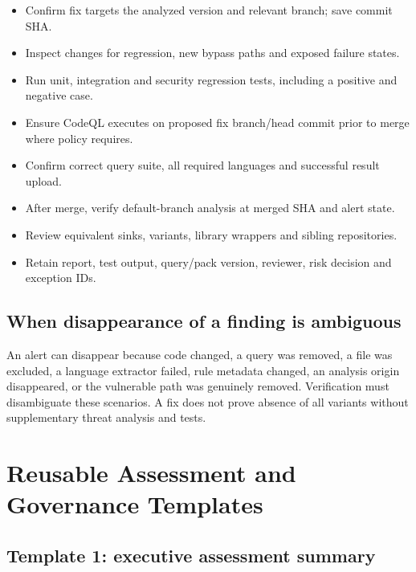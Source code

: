 \documentclass[11pt,letterpaper,oneside]{book}
\begin{document}
\begin{itemize}
\item Confirm fix targets the analyzed version and relevant branch; save commit SHA.
\item Inspect changes for regression, new bypass paths and exposed failure states.
\item Run unit, integration and security regression tests, including a positive and negative case.
\item Ensure CodeQL executes on proposed fix branch/head commit prior to merge where policy requires.
\item Confirm correct query suite, all required languages and successful result upload.
\item After merge, verify default-branch analysis at merged SHA and alert state.
\item Review equivalent sinks, variants, library wrappers and sibling repositories.
\item Retain report, test output, query/pack version, reviewer, risk decision and exception IDs.
\end{itemize}

\section{When disappearance of a finding is ambiguous}

An alert can disappear because code changed, a query was removed, a file was excluded, a language extractor failed, rule metadata changed, an analysis origin disappeared, or the vulnerable path was genuinely removed. Verification must disambiguate these scenarios. A fix does not prove absence of all variants without supplementary threat analysis and tests.

\chapter{Reusable Assessment and Governance Templates}

\section{Template 1: executive assessment summary}
\end{document}
